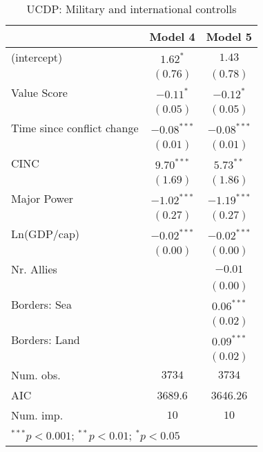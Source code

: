 
\begin{table}
\begin{center}
\begin{tabular}{l c c}
\toprule
 & Model 4 & Model 5 \\
\midrule
(intercept)                & $1.62^{*}$    & $1.43$        \\
                           & $(0.76)$      & $(0.78)$      \\
Value Score                & $-0.11^{*}$   & $-0.12^{*}$   \\
                           & $(0.05)$      & $(0.05)$      \\
Time since conflict change & $-0.08^{***}$ & $-0.08^{***}$ \\
                           & $(0.01)$      & $(0.01)$      \\
CINC                       & $9.70^{***}$  & $5.73^{**}$   \\
                           & $(1.69)$      & $(1.86)$      \\
Major Power                & $-1.02^{***}$ & $-1.19^{***}$ \\
                           & $(0.27)$      & $(0.27)$      \\
Ln(GDP/cap)                & $-0.02^{***}$ & $-0.02^{***}$ \\
                           & $(0.00)$      & $(0.00)$      \\
Nr. Allies                 &               & $-0.01$       \\
                           &               & $(0.00)$      \\
Borders: Sea               &               & $0.06^{***}$  \\
                           &               & $(0.02)$      \\
Borders: Land              &               & $0.09^{***}$  \\
                           &               & $(0.02)$      \\
\midrule
Num. obs.                  & $3734$        & $3734$        \\
AIC                        & 3689.6        & 3646.26       \\
Num. imp.                  & $10$          & $10$          \\
\bottomrule
\multicolumn{3}{l}{\scriptsize{$^{***}p<0.001$; $^{**}p<0.01$; $^{*}p<0.05$}}
\end{tabular}
\caption{UCDP: Military and international controlls}
\label{UCDP_2}
\end{center}
\end{table}

